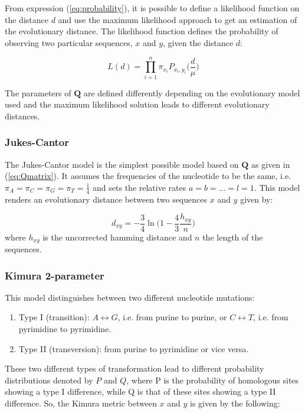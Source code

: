 From expression (\ref{eq:probability}), it is possible to define a likelihood function on the distance $d$ and use the maximum likelihood approach to get an estimation of the evolutionary distance. The likelihood function defines the probability of observing two particular sequences, $x$ and $y$, given the distance $d$:

$$L(d) = \prod_{i=1}^n \pi_{x_i}P_{x_i, y_i}\Big(\frac{d}{\mu}\Big)$$

The parameters of $\mathbf{Q}$ are defined differently depending on the evolutionary model used and the maximum likelihood solution leads to different evolutionary distances. 

\subsubsection{Jukes-Cantor}\label{JK_model}

The Jukes-Cantor model \cite{JC69} is the simplest possible model based on $\mathbf{Q}$ as given in (\ref{eq:Qmatrix}). It assumes the frequencies of the nucleotide to be the same, i.e. $\pi_A = \pi_C = \pi_G = \pi_T = \frac{1}{4}$ and sets the relative rates $a=b= ... = l = 1$. This model renders an evolutionary distance between two sequences $x$ and $y$ given by:

\begin{equation}
d_{xy} = -\frac{3}{4}\ln \bigg(1- \frac{4}{3}\frac{h_{xy}}{n}\bigg)
\label{eq:JC_distance}
\end{equation}
where $h_{xy}$ is the uncorrected hamming distance and $n$ the length of the sequences.

\subsubsection{Kimura 2-parameter}\label{K2P_model}

This model \cite{K80} distinguishes between two different nucleotide mutations:

\begin{enumerate}
    \item Type I (transition): $A\leftrightarrow G$, i.e. from purine to purine, or $C\leftrightarrow T$, i.e. from pyrimidine to pyrimidine.
    \item Type II (transversion): from purine to pyrimidine or vice versa.
\end{enumerate}

These two different types of transformation lead to different probability distributions denoted by $P$ and $Q$, where P is the probability of homologous sites showing a type I difference, while Q is that of these sites showing a type II difference. So, the Kimura \cite{K80} metric between $x$ and $y$ is given by the following:

